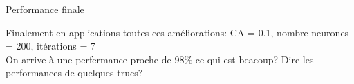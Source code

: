 \documentclass[10pt]{beamer}
\newcommand{\themename}{\textbf{\textsc{metropolis}}\xspace}
\begin{document}
\begin{frame}{Performance finale}



  Finalement en applications toutes ces am\'eliorations: CA = 0.1, nombre neurones = 200, it\'erations = 7 \\
	
  On arrive \`a une perfermance proche de $98$\% ce qui est beacoup? Dire les performances de quelques trucs?




\end{frame}

\appendix

{
\begin{frame}[standout]
\end{frame}
}

\end{document}
